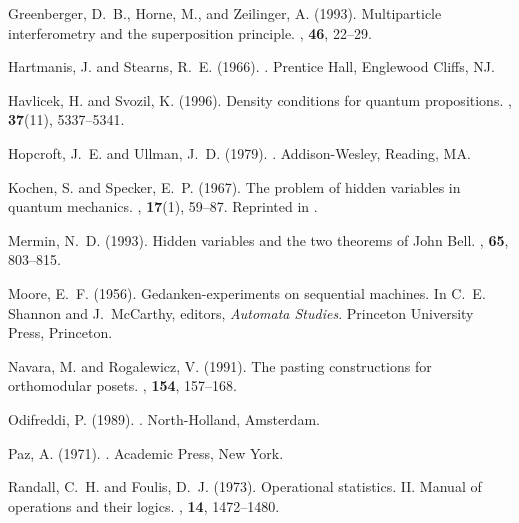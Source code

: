 \begin{thebibliography}{}
Greenberger, D.~B., Horne, M., and Zeilinger, A. (1993).
\newblock Multiparticle interferometry and the superposition principle.
, {\bf 46}, 22--29.

Hartmanis, J. and Stearns, R.~E. (1966).
.
\newblock Prentice Hall, Englewood Cliffs, NJ.

Havlicek, H. and Svozil, K. (1996).
\newblock Density conditions for quantum propositions.
, {\bf 37}(11), 5337--5341.

Hopcroft, J.~E. and Ullman, J.~D. (1979).
.
\newblock Addison-Wesley, Reading, MA.

Kochen, S. and Specker, E.~P. (1967).
\newblock The problem of hidden variables in quantum mechanics.
, {\bf 17}(1), 59--87.
\newblock Reprinted in \cite[pp. 235--263]{specker-ges}.

Mermin, N.~D. (1993).
\newblock Hidden variables and the two theorems of {J}ohn {B}ell.
, {\bf 65}, 803--815.

Moore, E.~F. (1956).
\newblock Gedanken-experiments on sequential machines.
\newblock In C.~E. Shannon and J.~McCarthy, editors, {\em Automata Studies}.
  Princeton University Press, Princeton.

Navara, M. and Rogalewicz, V. (1991).
\newblock The pasting constructions for orthomodular posets.
, {\bf 154}, 157--168.

Odifreddi, P. (1989).
.
\newblock North-Holland, Amsterdam.

Paz, A. (1971).
.
\newblock Academic Press, New York.

Randall, C.~H. and Foulis, D.~J. (1973).
\newblock Operational statistics. {II}. {M}anual of operations and their
  logics.
, {\bf 14}, 1472--1480.


\end{thebibliography}
